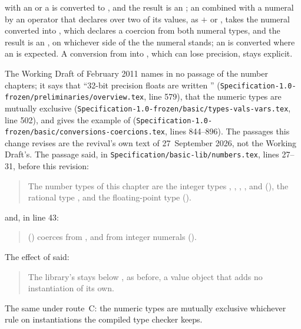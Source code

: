 \begin{description}
with an  or a  is
converted to , and the result is an ; an
 combined with a numeral by an operator that
 declares over two of its values, as $+$ or , takes the
numeral converted into , which declares a coercion from both
numeral types, and the result is an , on whichever side of
the  the numeral stands; an
 is converted where an  is expected.
A conversion from  into , which can lose
precision, stays explicit.
\item[Original text] The Working Draft of February 2011 names 
in no passage of the number chapters; it says that ``32-bit precision floats are
written ''
(\nolinkurl{Specification-1.0-frozen/preliminaries/overview.tex}, line 579),
that the numeric types are mutually exclusive
(\nolinkurl{Specification-1.0-frozen/basic/types-vals-vars.tex}, line 502), and
gives the example of 
(\nolinkurl{Specification-1.0-frozen/basic/conversions-coercions.tex}, lines
844--896).
The passages this change revises are the revival's own text of
27~September 2026, not the Working Draft's.
The passage said, in \nolinkurl{Specification/basic-lib/numbers.tex}, lines 27--31,
before this revision:
\begin{quote}
The number types of this chapter are
the integer types , , ,
, and  (),
the rational type ,
and the floating-point type  ().
\end{quote}
and, in line 43:
\begin{quote}
 () coerces from , and from integer numerals ().
\end{quote}
The effect of  said:
\begin{quote}
The library's  stays below , as before, a
value object that adds no instantiation of its own.
\end{quote}
\item[Route C] The same under route~C: the numeric types are mutually exclusive
whichever rule on instantiations the compiled type checker keeps.
\end{description}


